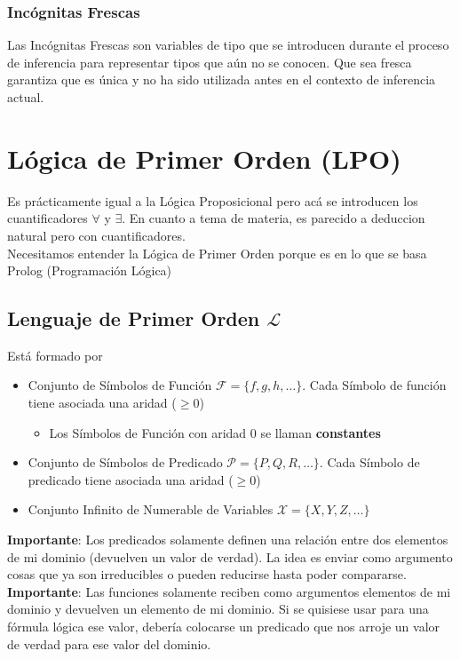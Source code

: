 \documentclass[10pt,a4paper]{article}
\begin{document}
\subsubsection*{Incógnitas Frescas}
Las Incógnitas Frescas son variables de tipo que se introducen durante el proceso de inferencia para representar tipos que aún no se conocen. Que sea fresca garantiza que es única y no ha sido utilizada antes en el contexto de inferencia actual. 
\section*{Lógica de Primer Orden (LPO)}
Es prácticamente igual a la Lógica Proposicional pero acá se introducen los cuantificadores $\forall$ y $\exists$. En cuanto a tema de materia, es parecido a deduccion natural pero con cuantificadores. \\
Necesitamos entender la Lógica de Primer Orden porque es en lo que se basa Prolog (Programación Lógica) 
\subsection*{Lenguaje de Primer Orden $\mathcal{L}$}
Está formado por 
\begin{itemize}
    \item Conjunto de Símbolos de Función $\mathcal{F} = \{f, g, h, \dots\}$. Cada Símbolo de función tiene asociada una aridad ($\ge 0$)
    \begin{itemize}
        \item Los Símbolos de Función con aridad 0 se llaman \textbf{constantes}
    \end{itemize}
    \item Conjunto de Símbolos de Predicado $\mathcal{P} = \{P, Q, R, \dots\}$. Cada Símbolo de predicado tiene asociada una aridad ($\ge 0$)
    \item Conjunto Infinito de Numerable de Variables $ \mathcal{X} = \{X, Y, Z, \dots\}$
\end{itemize}
\textbf{Importante}: Los predicados solamente definen una relación entre dos elementos de mi dominio (devuelven un valor de verdad). La idea es enviar como argumento cosas que ya son irreducibles o pueden reducirse hasta poder compararse. \\
\textbf{Importante}: Las funciones solamente reciben como argumentos elementos de mi dominio y devuelven un elemento de mi dominio. Si se quisiese usar para una fórmula lógica ese valor, debería colocarse un predicado que nos arroje un valor de verdad para ese valor del dominio. 
\end{document}
